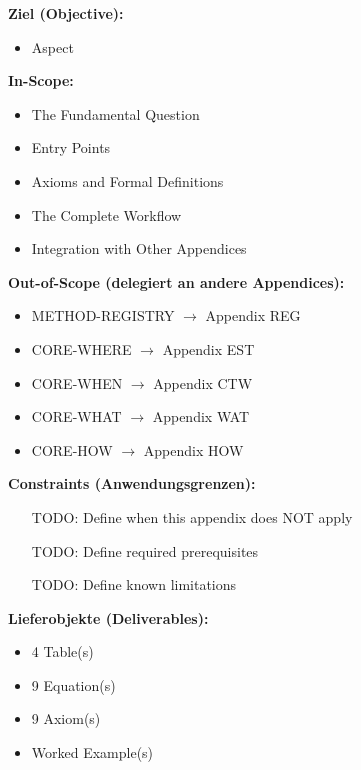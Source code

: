 \begin{tcolorbox}[
    colback=orange!5!white,
    colframe=orange!75!black,
    title={\textbf{Appendix Scope: Ziel / In-Scope / Out-of-Scope / Constraints}},
    fonttitle=\bfseries
]

\textbf{Ziel (Objective):}
\begin{itemize}[nosep]
    \item Aspect
\end{itemize}

\textbf{In-Scope:}
\begin{itemize}[nosep]
    \item The Fundamental Question
    \item Entry Points
    \item Axioms and Formal Definitions
    \item The Complete Workflow
    \item Integration with Other Appendices
\end{itemize}

\textbf{Out-of-Scope (delegiert an andere Appendices):}
\begin{itemize}[nosep]
    \item METHOD-REGISTRY $\rightarrow$ Appendix REG
    \item CORE-WHERE $\rightarrow$ Appendix EST
    \item CORE-WHEN $\rightarrow$ Appendix CTW
    \item CORE-WHAT $\rightarrow$ Appendix WAT
    \item CORE-HOW $\rightarrow$ Appendix HOW
\end{itemize}

\textbf{Constraints (Anwendungsgrenzen):}
\begin{itemize}[nosep]
    \item [TODO: Define when this appendix does NOT apply]
    \item [TODO: Define required prerequisites]
    \item [TODO: Define known limitations]
\end{itemize}

\textbf{Lieferobjekte (Deliverables):}
\begin{itemize}[nosep]
    \item 4 Table(s)
    \item 9 Equation(s)
    \item 9 Axiom(s)
    \item Worked Example(s)
\end{itemize}

\end{tcolorbox}




